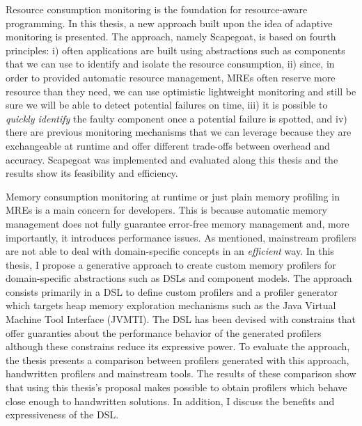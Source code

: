 Resource consumption monitoring is the foundation for resource-aware programming.
In this thesis, a new approach built upon the idea of adaptive monitoring is presented.
The approach, namely Scapegoat, is based on fourth principles: i) often applications are built using abstractions such as components that we can use to identify and isolate the resource consumption, ii) since, in order to provided automatic resource management, MREs often reserve more resource than they need, we can use optimistic lightweight monitoring and still be sure we will be able to detect potential failures on time, iii) it is possible to \textit{quickly identify} the faulty component once a potential failure is spotted, and iv) there are previous monitoring mechanisms that we can leverage because they are exchangeable at runtime and offer different trade-offs between overhead and accuracy.
Scapegoat was implemented and evaluated along this thesis and the results show its feasibility and efficiency.   


Memory consumption monitoring at runtime or just plain memory profiling in MREs is a main concern for developers.
This is because automatic memory management does not fully guarantee error-free memory management and, more importantly, it introduces performance issues.
As mentioned, mainstream profilers are not able to deal with domain-specific concepts in an \textit{efficient} way.
In this thesis, I propose a generative approach to create custom memory profilers for domain-specific abstractions such as DSLs and component models.
The approach consists primarily in a DSL to define custom profilers and a profiler generator which targets heap memory exploration mechanisms such as the Java Virtual Machine Tool Interface (JVMTI).
The DSL has been devised with constrains that offer guaranties about the performance behavior of the generated profilers although these constrains reduce its expressive power.
To evaluate the approach, the thesis presents a comparison between profilers generated with this approach, handwritten profilers and mainstream tools.
The results of these comparison show that using this thesis's proposal makes possible to obtain profilers which behave close enough to handwritten solutions.
In addition, I discuss the benefits and expressiveness of the DSL.

